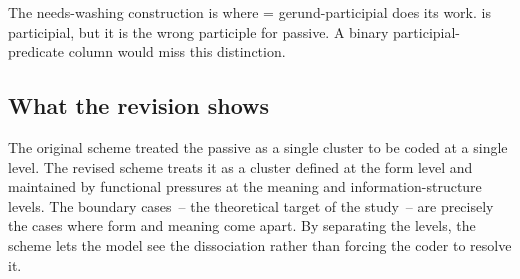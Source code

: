 \documentclass[12pt]{article}
\begin{document}
The needs-washing construction is where  = gerund-participial does its work.  is participial, but it is the wrong participle for passive. A binary participial-predicate column would miss this distinction.

\subsection{What the revision shows}

The original scheme treated the passive as a single cluster to be coded at a single level. The revised scheme treats it as a cluster defined at the form level and maintained by functional pressures at the meaning and information-structure levels. The boundary cases~-- the theoretical target of the study~-- are precisely the cases where form and meaning come apart. By separating the levels, the scheme lets the model see the dissociation rather than forcing the coder to resolve it.

\newpage
\printbibliography
\end{document}
